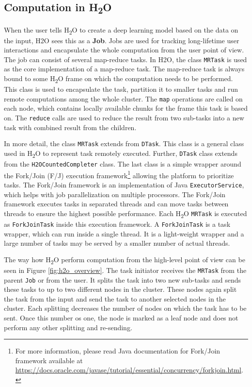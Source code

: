 \subsection{Computation in H\textsubscript{2}O}
When the user tells H\textsubscript{2}O to create a deep learning model based on the data on the input, H2O sees this as a \textbf{Job}. Jobs are used for tracking long-lifetime user interactions and encapsulate the whole computation from the user point of view. The job can consist of several map-reduce tasks. In H2O, the class \texttt{MRTask} is used as the core implementation of a map-reduce task. The map-reduce task is always bound to some H\textsubscript{2}O frame on which the computation needs to be performed. This class is used to encapsulate the task, partition it to smaller tasks and run remote computations among the whole cluster. The \texttt{map} operations are called on each node, which contains locally available chunks for the frame this task is based on. The \texttt{reduce} calls are used to reduce the result from two sub-tasks into a new task with combined result from the children.

In more detail, the class \texttt{MRTask} extends from \texttt{DTask}. This class is a general class used in H\textsubscript{2}O to represent task remotely executed. Further, \texttt{DTask} class extends from the \texttt{H2OCountedCompleter} class. The last class is a simple wrapper around the Fork/Join (F/J) execution framework\footnote{For more information, please read Java documentation for Fork/Join framework available at \url{https://docs.oracle.com/javase/tutorial/essential/concurrency/forkjoin.html}.} allowing the platform to prioritize tasks. The Fork/Join framework is an implementation of Java \texttt{ExecutorService}, which helps with job parallelization on multiple processors. The Fork/Join framework executes tasks in separated threads and can move tasks between threads to ensure the highest possible performance. Each H\textsubscript{2}O \texttt{MRTask} is executed as \texttt{ForkJoinTask} inside this execution framework. A \texttt{ForkJoinTask} is a task wrapper, which can run inside a single thread. It is a light-weight wrapper and a large number of tasks may be served by a smaller number of actual threads.

The way how H\textsubscript{2}O perform computation from the high-level point of view can be seen in Figure \ref{fig:h2o_overview}. The task initiator receives the \texttt{MRTask} from the parent \texttt{Job} or from the user. It splits the task into two new sub-tasks and sends these tasks to up to two different nodes in the cluster. These nodes again split the task from the input and send the task to another selected nodes in the cluster. Each splitting decreases the number of nodes on which the task has to be sent. Once this number os one, the node is marked as a leaf node and does not perform any other splitting and re-sending.

